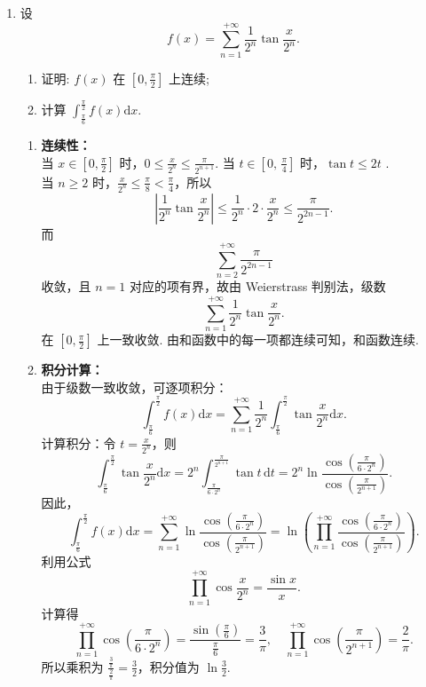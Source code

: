 \begin{enumerate}
    \item[3.]设
    \[\displaystyle f(x) = \sum_{n = 1}^{+\infty}\frac{1}{2^{n}}\tan \frac{x}{2^{n}}.\]
    \begin{enumerate}
        \item[(a)]证明: \(f(x)\) 在 \(\displaystyle \left[0, \frac{\pi}{2}\right]\) 上连续;
        \item[(b)]计算 \(\displaystyle \int_{\frac{\pi}{6}}^{\frac{\pi}{2}} f(x) \mathrm{d}x\).
    \end{enumerate}
    \begin{solution}
        \begin{enumerate}
        \item[(a)] \textbf{连续性：} \\
        当 $\displaystyle x\in [0,\frac{\pi}{2}]$ 时，$\displaystyle 0\le \frac{x}{2^n}\le \frac{\pi}{2^{n+1}}$. 当 $\displaystyle t\in [0,\,\frac{\pi}{4}]$ 时，$\tan t \le 2t$ .\\
        当 $n\ge 2$ 时，$\displaystyle \frac{x}{2^n}\le \frac{\pi}{8}<\frac{\pi}{4}$，所以
        \[
        \left|\frac{1}{2^n}\tan\frac{x}{2^n}\right|\le \frac{1}{2^n}\cdot 2\cdot\frac{x}{2^n}\le \frac{\pi}{2^{2n-1}}.
        \]
        而 
        \[
        \sum_{n=2}^{+\infty} \frac{\pi}{2^{2n-1}}
        \]
        收敛，且 $n=1$ 对应的项有界，故由 Weierstrass 判别法，级数
        \[
        \sum_{n=1}^{+\infty}\frac{1}{2^n}\tan\frac{x}{2^n}.
        \]
        在 $\displaystyle [0,\frac{\pi}{2}]$ 上一致收敛. 由和函数中的每一项都连续可知，和函数连续. 

        \item[(b)] \textbf{积分计算：} \\
        由于级数一致收敛，可逐项积分：
        \[
        \int_{\frac{\pi}{6}}^{\frac{\pi}{2}} f(x) \mathrm{d}x = \sum_{n=1}^{+\infty} \frac{1}{2^n} \int_{\frac{\pi}{6}}^{\frac{\pi}{2}} \tan\frac{x}{2^n} \mathrm{d}x.
        \]
        计算积分：令 $\displaystyle t=\frac{x}{2^n}$，则
        \[
        \int_{\frac{\pi}{6}}^{\frac{\pi}{2}} \tan\frac{x}{2^n} \mathrm{d}x = 2^n \int_{\frac{\pi}{6\cdot 2^n}}^{\frac{\pi}{2^{n+1}}} \tan t \, \mathrm{d}t = 2^n \ln\frac{\cos\left(\frac{\pi}{6\cdot 2^n}\right)}{\cos\left(\frac{\pi}{2^{n+1}}\right)}.
        \]
        因此，
        \[
        \int_{\frac{\pi}{6}}^{\frac{\pi}{2}} f(x) \mathrm{d}x 
        = \sum_{n=1}^{+\infty} \ln\frac{\cos\left(\frac{\pi}{6\cdot 2^n}\right)}{\cos\left(\frac{\pi}{2^{n+1}}\right)} 
        = \ln\left( \prod_{n=1}^{+\infty} \frac{\cos\left(\frac{\pi}{6\cdot 2^n}\right)}{\cos\left(\frac{\pi}{2^{n+1}}\right)} \right).
        \]
        利用公式 
        \[
        \prod_{n=1}^{+\infty} \cos\frac{x}{2^n} = \frac{\sin x}{x}.
        \]
        计算得
        \[
        \prod_{n=1}^{+\infty} \cos\left(\frac{\pi}{6\cdot 2^n}\right) = \frac{\sin(\frac{\pi}{6})}{\frac{\pi}{6}} = \frac{3}{\pi}, \quad \prod_{n=1}^{+\infty} \cos\left(\frac{\pi}{2^{n+1}}\right) = \frac{2}{\pi}.
        \]
        所以乘积为 $\displaystyle \frac{\frac{3}{\pi}}{\frac{2}{\pi}} = \frac{3}{2}$，积分值为 $\displaystyle \ln\frac{3}{2}$.
        \end{enumerate}
    \end{solution}


\end{enumerate}
